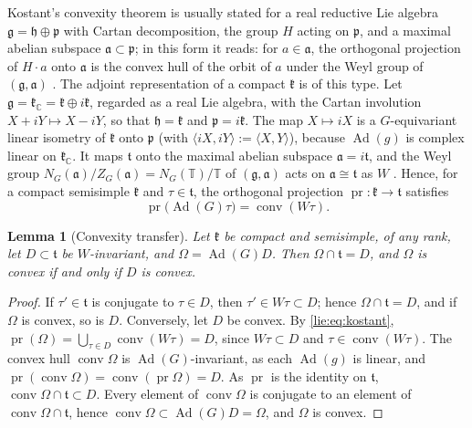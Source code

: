 \documentclass[11pt]{amsart}
\newtheorem{lemma}[theorem]{Lemma}
\theoremstyle{definition}
\theoremstyle{remark}
\numberwithin{equation}{section}
\newcommand{\C}{\mathbb{C}}
\newcommand{\Ad}{\operatorname{Ad}}
\newcommand{\kf}{\mathfrak{k}}
\newcommand{\tf}{\mathfrak{t}}
\begin{document}
Kostant's convexity theorem \cite{Kos73} is usually stated for a real reductive Lie algebra $\mathfrak g=\mathfrak h\oplus\mathfrak p$ with Cartan decomposition, the group $H$ acting on $\mathfrak p$, and a maximal abelian subspace $\mathfrak a\subset\mathfrak p$; in this form it reads: for $a\in\mathfrak a$, the orthogonal projection of $H\cdot a$ onto $\mathfrak a$ is the convex hull of the orbit of $a$ under the Weyl group of $(\mathfrak g,\mathfrak a)$ \cite[Theorem~2.2]{Lew00}. The adjoint representation of a compact $\kf$ is of this type. Let $\mathfrak g=\kf_\C=\kf\oplus i\kf$, regarded as a real Lie algebra, with the Cartan involution $X+iY\mapsto X-iY$, so that $\mathfrak h=\kf$ and $\mathfrak p=i\kf$. The map $X\mapsto iX$ is a $G$-equivariant linear isometry of $\kf$ onto $\mathfrak p$ (with $\langle iX,iY\rangle:=\langle X,Y\rangle$), because $\Ad(g)$ is complex linear on $\kf_\C$. It maps $\tf$ onto the maximal abelian subspace $\mathfrak a=i\tf$, and the Weyl group $N_G(\mathfrak a)/Z_G(\mathfrak a)=N_G(\mathbb T)/\mathbb T$ of $(\mathfrak g,\mathfrak a)$ acts on $\mathfrak a\cong\tf$ as $W$ \cite[Ch.~VI]{Kna02}. Hence, for a compact semisimple $\kf$ and $\tau\in\tf$, the orthogonal projection $\operatorname{pr}\colon\kf\to\tf$ satisfies
\begin{equation}\label{lie:eq:kostant}
\operatorname{pr}\big(\Ad(G)\tau\big)=\operatorname{conv}(W\tau).
\end{equation}

\begin{lemma}[Convexity transfer]\label{lie:lem:convex}
Let $\kf$ be compact and semisimple, of any rank, let $D\subset\tf$ be $W$-invariant, and $\Omega=\Ad(G)D$. Then $\Omega\cap\tf=D$, and $\Omega$ is convex if and only if $D$ is convex.
\end{lemma}

\begin{proof}
If $\tau'\in\tf$ is conjugate to $\tau\in D$, then $\tau'\in W\tau\subset D$; hence $\Omega\cap\tf=D$, and if $\Omega$ is convex, so is $D$. Conversely, let $D$ be convex. By \eqref{lie:eq:kostant}, $\operatorname{pr}(\Omega)=\bigcup_{\tau\in D}\operatorname{conv}(W\tau)=D$, since $W\tau\subset D$ and $\tau\in\operatorname{conv}(W\tau)$. The convex hull $\operatorname{conv}\Omega$ is $\Ad(G)$-invariant, as each $\Ad(g)$ is linear, and $\operatorname{pr}(\operatorname{conv}\Omega)=\operatorname{conv}(\operatorname{pr}\Omega)=D$. As $\operatorname{pr}$ is the identity on $\tf$, $\operatorname{conv}\Omega\cap\tf\subset D$. Every element of $\operatorname{conv}\Omega$ is conjugate to an element of $\operatorname{conv}\Omega\cap\tf$, hence $\operatorname{conv}\Omega\subset\Ad(G)D=\Omega$, and $\Omega$ is convex.
\end{proof}
\end{document}
